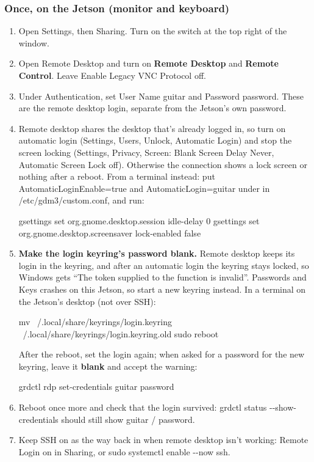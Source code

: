 \documentclass[11pt,letterpaper]{article}
\newcommand{\code}[1]{\textcolor{codeblue}{\ttfamily\smaller\relax #1}}
\begin{document}
\subsubsection*{Once, on the Jetson (monitor and keyboard)}
\begin{enumerate}
  \item Open Settings, then Sharing. Turn on the switch at the top right of the window.
  \item Open Remote Desktop and turn on \textbf{Remote Desktop} and \textbf{Remote Control}. Leave Enable Legacy VNC Protocol off.
  \item Under Authentication, set User Name \code{guitar} and Password \code{password}. These are the remote desktop login, separate from the Jetson's own password.
  \item Remote desktop shares the desktop that's already logged in, so turn on automatic login (Settings, Users, Unlock, Automatic Login) and stop the screen locking (Settings, Privacy, Screen: Blank Screen Delay Never, Automatic Screen Lock off). Otherwise the connection shows a lock screen or nothing after a reboot. From a terminal instead: put \code{AutomaticLoginEnable=\allowbreak{}true} and \code{AutomaticLogin=\allowbreak{}guitar} under \code{[daemon]} in \code{/\allowbreak{}etc/\allowbreak{}gdm3/\allowbreak{}custom.conf}, and run:
\begin{codeblock}
gsettings set org.gnome.desktop.session idle-delay 0
gsettings set org.gnome.desktop.screensaver lock-enabled false
\end{codeblock}
  \item \textbf{Make the login keyring's password blank.} Remote desktop keeps its login in the keyring, and after an automatic login the keyring stays locked, so Windows gets ``The token supplied to the function is invalid''. Passwords and Keys crashes on this Jetson, so start a new keyring instead. In a terminal on the Jetson's desktop (not over SSH):
\begin{codeblock}
mv ~/.local/share/keyrings/login.keyring ~/.local/share/keyrings/login.keyring.old
sudo reboot
\end{codeblock}
After the reboot, set the login again; when asked for a password for the new keyring, leave it \textbf{blank} and accept the warning:
\begin{codeblock}
grdctl rdp set-credentials guitar password
\end{codeblock}
  \item Reboot once more and check that the login survived: \code{grdctl status -{}-{}show-{}\allowbreak{}credentials} should still show \code{guitar} / \code{password}.
  \item Keep SSH on as the way back in when remote desktop isn't working: Remote Login on in Sharing, or \code{sudo systemctl enable -{}-{}now ssh}.
\end{enumerate}
\end{document}
